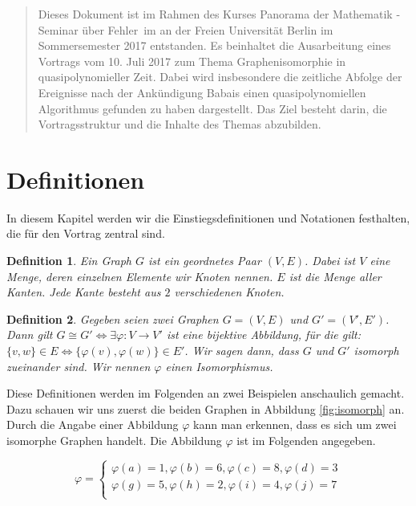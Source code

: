 \documentclass[a4paper]{article}
\newtheorem{definition}{Definition}
\begin{document}
\newpage
\maketitle
\begin{abstract}
Dieses Dokument ist im Rahmen des Kurses \glqq Panorama der Mathematik - Seminar über Fehler\grqq\ im an der Freien Universität Berlin im Sommersemester 2017 entstanden. Es beinhaltet die Ausarbeitung eines Vortrags vom 10. Juli 2017 zum Thema \glqq Graphenisomorphie in quasipolynomieller Zeit\grqq. Dabei wird insbesondere die zeitliche Abfolge der Ereignisse nach der Ankündigung Babais einen quasipolynomiellen Algorithmus gefunden zu haben dargestellt. Das Ziel besteht darin, die Vortragsstruktur und die Inhalte des Themas abzubilden. \end{abstract}

\section{Definitionen}
In diesem Kapitel werden wir die Einstiegsdefinitionen und Notationen festhalten, die für den Vortrag zentral sind.
\begin{definition}
	Ein Graph $G$ ist ein geordnetes Paar $(V, E)$. Dabei ist $V$ eine Menge, deren einzelnen Elemente wir Knoten nennen. $E$ ist die Menge aller Kanten. Jede Kante besteht aus $2$ verschiedenen Knoten.
\end{definition}

\begin{definition}
Gegeben seien zwei Graphen $G = (V,E)$ und $G' = (V',E')$. Dann gilt $G\cong G' \Leftrightarrow \exists \varphi:V\rightarrow V'$ ist eine bijektive Abbildung, für die gilt: $\{v,w\}\in E \Leftrightarrow \{\varphi(v),\varphi(w)\}\in E'$. Wir sagen dann, dass $G$ und $G'$ isomorph zueinander sind. Wir nennen $\varphi$ einen Isomorphismus.
\end{definition}

Diese Definitionen werden im Folgenden an zwei Beispielen anschaulich gemacht. Dazu schauen wir uns zuerst die beiden Graphen in Abbildung \ref{fig:isomorph} an. Durch die Angabe einer Abbildung $\varphi$ kann man erkennen, dass es sich um zwei isomorphe Graphen handelt. Die Abbildung $\varphi$ ist im Folgenden angegeben.

$$\varphi =
    \begin{cases}
    \varphi(a) = 1, \varphi(b) = 6,
    \varphi(c) = 8, \varphi(d) = 3\\
    \varphi(g) = 5, \varphi(h) = 2,
    \varphi(i) = 4, \varphi(j) = 7\\
    \end{cases}  
$$
\end{document}
